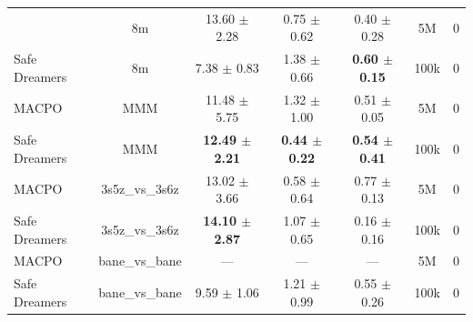 \documentclass{article}
\begin{document}
\begin{longtable}{lcccccc}
{\midrule
MACPO & 8m & 13.60 $\pm$ 2.28 & 0.75 $\pm$ 0.62 & 0.40 $\pm$ 0.28 & 5M & 0 \\
Safe Dreamers & 8m & 7.38 $\pm$ 0.83 & 1.38 $\pm$ 0.66 & \textbf{0.60 $\pm$ 0.15} & 100k & 0 \\
\midrule
MACPO & MMM & 11.48 $\pm$ 5.75 & 1.32 $\pm$ 1.00 & 0.51 $\pm$ 0.05 & 5M & 0 \\
Safe Dreamers & MMM & \textbf{12.49 $\pm$ 2.21} & \textbf{0.44 $\pm$ 0.22} & \textbf{0.54 $\pm$ 0.41} & 100k & 0 \\
\midrule
MACPO & 3s5z\_vs\_3s6z & 13.02 $\pm$ 3.66 & 0.58 $\pm$ 0.64 & 0.77 $\pm$ 0.13 & 5M & 0 \\
Safe Dreamers & 3s5z\_vs\_3s6z & \textbf{14.10 $\pm$ 2.87} & 1.07 $\pm$ 0.65 & 0.16 $\pm$ 0.16 & 100k & 0 \\
\midrule
MACPO & bane\_vs\_bane & — & — & — & 5M & 0 \\
Safe Dreamers & bane\_vs\_bane & 9.59 $\pm$ 1.06 & 1.21 $\pm$ 0.99 & 0.55 $\pm$ 0.26 & 100k & 0 \\
\end{longtable}
\end{document}
